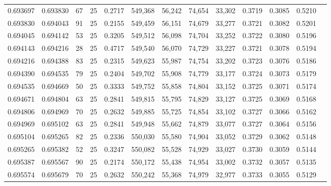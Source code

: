 \begin{tabular}{rrrrrrrrrrrrr}
0.693697 & 0.693830 &    67 &  25 &                                     0.2717 & 549,368 &  56,242 &  74,654 &  33,302 & 0.3719 & 0.3085 & 0.5210 \\
0.693830 & 0.694043 &    91 &  25 &                                     0.2155 & 549,459 &  56,151 &  74,679 &  33,277 & 0.3721 & 0.3082 & 0.5201 \\
0.694045 & 0.694142 &    53 &  25 &                                     0.3205 & 549,512 &  56,098 &  74,704 &  33,252 & 0.3722 & 0.3080 & 0.5196 \\
0.694143 & 0.694216 &    28 &  25 &                                     0.4717 & 549,540 &  56,070 &  74,729 &  33,227 & 0.3721 & 0.3078 & 0.5194 \\
0.694216 & 0.694388 &    83 &  25 &                                     0.2315 & 549,623 &  55,987 &  74,754 &  33,202 & 0.3723 & 0.3076 & 0.5186 \\
0.694390 & 0.694535 &    79 &  25 &                                     0.2404 & 549,702 &  55,908 &  74,779 &  33,177 & 0.3724 & 0.3073 & 0.5179 \\
0.694535 & 0.694669 &    50 &  25 &                                     0.3333 & 549,752 &  55,858 &  74,804 &  33,152 & 0.3725 & 0.3071 & 0.5174 \\
0.694671 & 0.694804 &    63 &  25 &                                     0.2841 & 549,815 &  55,795 &  74,829 &  33,127 & 0.3725 & 0.3069 & 0.5168 \\
0.694806 & 0.694969 &    70 &  25 &                                     0.2632 & 549,885 &  55,725 &  74,854 &  33,102 & 0.3727 & 0.3066 & 0.5162 \\
0.694969 & 0.695102 &    63 &  25 &                                     0.2841 & 549,948 &  55,662 &  74,879 &  33,077 & 0.3727 & 0.3064 & 0.5156 \\
0.695104 & 0.695265 &    82 &  25 &                                     0.2336 & 550,030 &  55,580 &  74,904 &  33,052 & 0.3729 & 0.3062 & 0.5148 \\
0.695265 & 0.695382 &    52 &  25 &                                     0.3247 & 550,082 &  55,528 &  74,929 &  33,027 & 0.3730 & 0.3059 & 0.5144 \\
0.695387 & 0.695567 &    90 &  25 &                                     0.2174 & 550,172 &  55,438 &  74,954 &  33,002 & 0.3732 & 0.3057 & 0.5135 \\
0.695574 & 0.695679 &    70 &  25 &                                     0.2632 & 550,242 &  55,368 &  74,979 &  32,977 & 0.3733 & 0.3055 & 0.5129 \\

\end{tabular}
